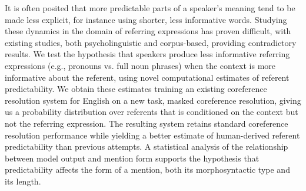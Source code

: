 It is often posited that more predictable parts of a speaker's meaning tend to be made less explicit, for instance using shorter, less informative words. Studying these dynamics in the domain of referring expressions has proven difficult, with existing studies, both psycholinguistic and corpus-based, providing contradictory results. We test the hypothesis that speakers produce less informative referring expressions (e.g., pronouns vs. full noun phrases) when the context is more informative about the referent, using novel computational estimates of referent predictability. We obtain these estimates training an existing coreference resolution system for English on a new task, masked coreference resolution, giving us a probability distribution over referents that is conditioned on the context but not the referring expression. The resulting system retains standard coreference resolution performance while yielding a better estimate of human-derived referent predictability than previous attempts. A statistical analysis of the relationship between model output and mention form supports the hypothesis that predictability affects the form of a mention, both its morphosyntactic type and its length.
